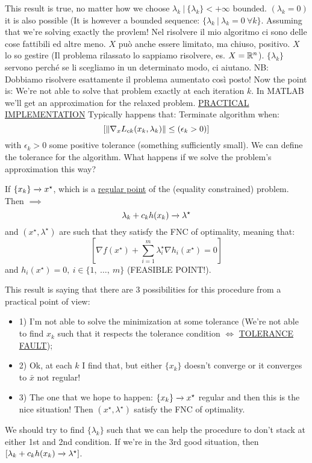 This result is true, no matter how we choose $\lambda_k\ |\ \{\lambda_k\} < +\infty$ bounded. $(\lambda_k=0)$ it is also possible (It is however a bounded sequence: $\{\lambda_k\ |\ \lambda_k=0\ \forall k\}$. Assuming that we're solving exactly the provlem! Nel risolvere il mio algoritmo ci sono delle cose fattibili ed altre meno. $X$ può anche essere limitato, ma chiuso, positivo. $X$ lo so gestire (Il problema rilassato lo sappiamo risolvere, es. $X=\mathbb{R}^n$). 
$\{\lambda_k\}$ servono perché se li scegliamo in un determinato modo, ci aiutano. NB: Dobbiamo risolvere esattamente il problema aumentato così posto! Now the point is: We're not able to solve that problem exactly at each iteration $k$. In MATLAB we'll get an approximation for the relaxed problem.
\underline{PRACTICAL IMPLEMENTATION} Typically happens that: Terminate algorithm when:
\[
	[\lVert\nabla_x{L_{ck}(x_k,\lambda_k)}\rVert \leq (\epsilon_k>0)]
\]
with $\epsilon_k>0$ some positive tolerance (something sufficiently small). We can define the tolerance for the algorithm. What happens if we solve the problem's approximation this way?

\begin{prop}
If $\{x_k\} \tendsto{} x^\star$, which is a \underline{regular point} of the (equality constrained) problem. Then $\implies$
\[	
	\lambda_k + c_kh(x_k) \tendsto{} \lambda^\star
\]
and $(x^\star,\lambda^\star)$ are such that they satisfy the FNC of optimality, meaning that:
\[
	[\nabla{f(x^\star)} + \sum_{i=1}^m{\lambda_i^\star\nabla{h_i(x^\star)}} = 0]
\]
and $h_i(x^\star) =0,\ i\in\{1,\ \dots,\ m\}$ (FEASIBLE POINT!).
\end{prop}

This result is saying that there are 3 possibilities for this procedure from a practical point of view:

\begin{itemize}
\item{1)} I'm not able to solve the minimization at some tolerance (We're not able to find $x_k$ such that it respects the tolerance condition $\iff$ \underline{TOLERANCE FAULT});
\item{2)} Ok, at each $k$ I find that, but either $\{x_k\}$ doesn't converge or it converges to $\bar{x}$ not regular!
\item{3)} The one that we hope to happen: $\{x_k\} \tendsto{} x^\star$ regular and then this is the nice situation! Then $(x^\star,\lambda^\star)$ satisfy the FNC of optimality.
\end{itemize}
We should try to find $\{\lambda_k\}$ such that we can help the procedure to don't stack at either 1st and 2nd condition. If we're in the 3rd good situation, then $[\lambda_k + c_kh(x_k) \tendsto{} \lambda^\star]$.

